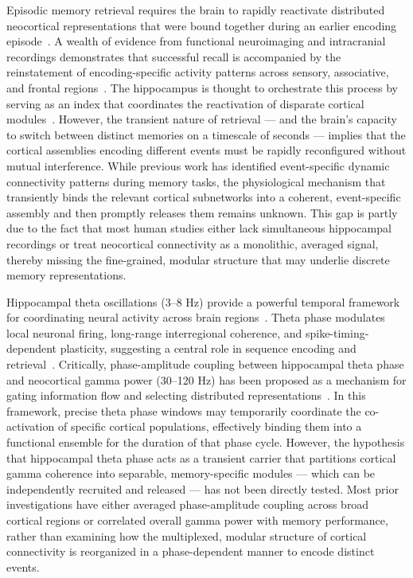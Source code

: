 \documentclass{article}
\begin{document}
Episodic memory retrieval requires the brain to rapidly reactivate distributed neocortical representations that were bound together during an earlier encoding episode~\cite{tulving2002episodic, mcclelland1995memory}. A wealth of evidence from functional neuroimaging and intracranial recordings demonstrates that successful recall is accompanied by the reinstatement of encoding-specific activity patterns across sensory, associative, and frontal regions~\cite{norman2006beyond, staudigl2015coordinated}. The hippocampus is thought to orchestrate this process by serving as an index that coordinates the reactivation of disparate cortical modules~\cite{teyler1987memory, eichenbaum2007hippocampus}. However, the transient nature of retrieval — and the brain's capacity to switch between distinct memories on a timescale of seconds — implies that the cortical assemblies encoding different events must be rapidly reconfigured without mutual interference. While previous work has identified event-specific dynamic connectivity patterns during memory tasks, the physiological mechanism that transiently binds the relevant cortical subnetworks into a coherent, event-specific assembly and then promptly releases them remains unknown. This gap is partly due to the fact that most human studies either lack simultaneous hippocampal recordings or treat neocortical connectivity as a monolithic, averaged signal, thereby missing the fine-grained, modular structure that may underlie discrete memory representations.

Hippocampal theta oscillations (3–8 Hz) provide a powerful temporal framework for coordinating neural activity across brain regions~\cite{buzsaki2002theta, colgin2013mechanisms}. Theta phase modulates local neuronal firing, long-range interregional coherence, and spike-timing-dependent plasticity, suggesting a central role in sequence encoding and retrieval~\cite{lisman2005theta, dragoi1999temporal}. Critically, phase-amplitude coupling between hippocampal theta phase and neocortical gamma power (30–120 Hz) has been proposed as a mechanism for gating information flow and selecting distributed representations~\cite{canolty2006high, axmacher2010cross}. In this framework, precise theta phase windows may temporarily coordinate the co-activation of specific cortical populations, effectively binding them into a functional ensemble for the duration of that phase cycle. However, the hypothesis that hippocampal theta phase acts as a transient carrier that partitions cortical gamma coherence into separable, memory-specific modules — which can be independently recruited and released — has not been directly tested. Most prior investigations have either averaged phase-amplitude coupling across broad cortical regions or correlated overall gamma power with memory performance, rather than examining how the multiplexed, modular structure of cortical connectivity is reorganized in a phase-dependent manner to encode distinct events.
\end{document}
